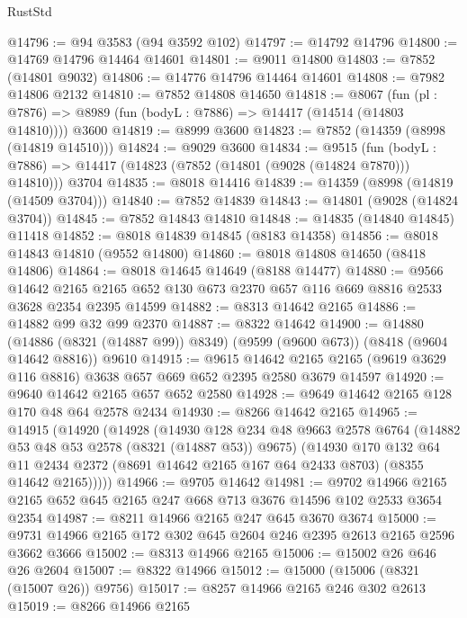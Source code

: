 \begin{lexlean}{RustStd}
\begin{coremodule}
@14796 := @94 @3583 (@94 @3592 @102)
@14797 := @14792 @14796
@14800 := @14769 @14796 @14464 @14601
@14801 := @9011 @14800
@14803 := @7852 (@14801 @9032)
@14806 := @14776 @14796 @14464 @14601
@14808 := @7982 @14806 @2132
@14810 := @7852 @14808 @14650
@14818 := @8067
    (fun (pl : @7876) => @8989 (fun (bodyL : @7886) => @14417 (@14514 (@14803 @14810))))
    @3600
@14819 := @8999 @3600
@14823 := @7852 (@14359 (@8998 (@14819 @14510)))
@14824 := @9029 @3600
@14834 := @9515
    (fun (bodyL : @7886) => @14417 (@14823 (@7852 (@14801 (@9028 (@14824 @7870))) @14810)))
    @3704
@14835 := @8018 @14416
@14839 := @14359 (@8998 (@14819 (@14509 @3704)))
@14840 := @7852 @14839
@14843 := @14801 (@9028 (@14824 @3704))
@14845 := @7852 @14843 @14810
@14848 := @14835 (@14840 @14845) @11418
@14852 := @8018 @14839 @14845 (@8183 @14358)
@14856 := @8018 @14843 @14810 (@9552 @14800)
@14860 := @8018 @14808 @14650 (@8418 @14806)
@14864 := @8018 @14645 @14649 (@8188 @14477)
@14880 := @9566
    @14642
    @2165
    @2165
    @652
    @130
    @673
    @2370
    @657
    @116
    @669
    @8816
    @2533
    @3628
    @2354
    @2395
    @14599
@14882 := @8313 @14642 @2165
@14886 := @14882 @99 @32 @99 @2370
@14887 := @8322 @14642
@14900 := @14880
    (@14886 (@8321 (@14887 @99)) @8349)
    (@9599 (@9600 @673))
    (@8418 (@9604 @14642 @8816))
    @9610
@14915 := @9615
    @14642
    @2165
    @2165
    (@9619 @3629 @116 @8816)
    @3638
    @657
    @669
    @652
    @2395
    @2580
    @3679
    @14597
@14920 := @9640 @14642 @2165 @657 @652 @2580
@14928 := @9649 @14642 @2165 @128 @170 @48 @64 @2578 @2434
@14930 := @8266 @14642 @2165
@14965 := @14915
    (@14920
      (@14928
        (@14930
          @128
          @234
          @48
          @9663
          @2578
          @6764
          (@14882 @53 @48 @53 @2578 (@8321 (@14887 @53)) @9675)
          (@14930
            @170
            @132
            @64
            @11
            @2434
            @2372
            (@8691 @14642 @2165 @167 @64 @2433 @8703)
            (@8355 @14642 @2165)))))
@14966 := @9705 @14642
@14981 := @9702
    @14966
    @2165
    @2165
    @652
    @645
    @2165
    @247
    @668
    @713
    @3676
    @14596
    @102
    @2533
    @3654
    @2354
@14987 := @8211 @14966 @2165 @247 @645 @3670 @3674
@15000 := @9731 @14966 @2165 @172 @302 @645 @2604 @246 @2395 @2613 @2165 @2596 @3662 @3666
@15002 := @8313 @14966 @2165
@15006 := @15002 @26 @646 @26 @2604
@15007 := @8322 @14966
@15012 := @15000 (@15006 (@8321 (@15007 @26)) @9756)
@15017 := @8257 @14966 @2165 @246 @302 @2613
@15019 := @8266 @14966 @2165

\end{coremodule}
\end{lexlean}
